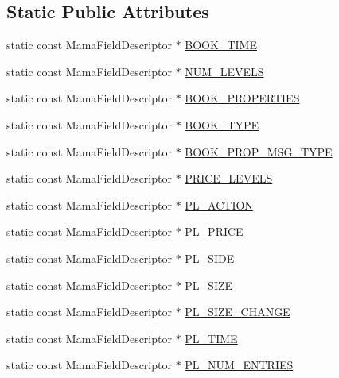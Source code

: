 \subsection*{Static Public Attributes}
\begin{CompactItemize}
\item 
static const Mama\-Field\-Descriptor $\ast$ \hyperlink{classWombat_1_1MamdaOrderBookFields_04859b3d0adfbde9261497ede9bb50a8}{BOOK\_\-TIME}
\item 
static const Mama\-Field\-Descriptor $\ast$ \hyperlink{classWombat_1_1MamdaOrderBookFields_3ad71b502d9479a0fa06734e43e4bfd2}{NUM\_\-LEVELS}
\item 
static const Mama\-Field\-Descriptor $\ast$ \hyperlink{classWombat_1_1MamdaOrderBookFields_867fd7b7676f0520810b5afddb4c33ce}{BOOK\_\-PROPERTIES}
\item 
static const Mama\-Field\-Descriptor $\ast$ \hyperlink{classWombat_1_1MamdaOrderBookFields_0004d0b389819a6dfa94be11f9ea25ff}{BOOK\_\-TYPE}
\item 
static const Mama\-Field\-Descriptor $\ast$ \hyperlink{classWombat_1_1MamdaOrderBookFields_df81cad9ff8d769c4cd3f15b07ba4d20}{BOOK\_\-PROP\_\-MSG\_\-TYPE}
\item 
static const Mama\-Field\-Descriptor $\ast$ \hyperlink{classWombat_1_1MamdaOrderBookFields_d67bbacb5cd5e4073d82ea992beaba7e}{PRICE\_\-LEVELS}
\item 
static const Mama\-Field\-Descriptor $\ast$ \hyperlink{classWombat_1_1MamdaOrderBookFields_bf19e07918099e6eb778e109cde0f30c}{PL\_\-ACTION}
\item 
static const Mama\-Field\-Descriptor $\ast$ \hyperlink{classWombat_1_1MamdaOrderBookFields_119f690871ddc49ea876e9af6e60eb9b}{PL\_\-PRICE}
\item 
static const Mama\-Field\-Descriptor $\ast$ \hyperlink{classWombat_1_1MamdaOrderBookFields_5d3d689a5986ae6df04e277a68d0985f}{PL\_\-SIDE}
\item 
static const Mama\-Field\-Descriptor $\ast$ \hyperlink{classWombat_1_1MamdaOrderBookFields_fd82c2a77cd3b2ba171185507eb5d738}{PL\_\-SIZE}
\item 
static const Mama\-Field\-Descriptor $\ast$ \hyperlink{classWombat_1_1MamdaOrderBookFields_24d5744fd2926d304821a6a8ea05ef4d}{PL\_\-SIZE\_\-CHANGE}
\item 
static const Mama\-Field\-Descriptor $\ast$ \hyperlink{classWombat_1_1MamdaOrderBookFields_4e99e0eff55a32f95a81ad35a8234f02}{PL\_\-TIME}
\item 
static const Mama\-Field\-Descriptor $\ast$ \hyperlink{classWombat_1_1MamdaOrderBookFields_2454d12c5917b7c56ed04466eb912b5b}{PL\_\-NUM\_\-ENTRIES}

\end{CompactItemize}
